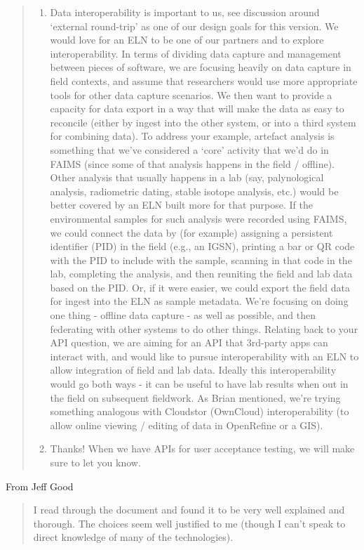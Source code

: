 \documentclass{faims3_report}
\begin{document}
\begin{quote}
\begin{enumerate}[itemsep=1em]
\item Data interoperability is important to us, see discussion around `external
  round-trip' as one of our design goals for this version. We would love
  for an ELN to be one of our partners and to explore interoperability. In 
  terms of dividing data capture and management between pieces of software, we 
  are focusing heavily on data capture in field contexts, and assume that 
  researchers would use more appropriate tools for other data capture scenarios.
  We then want to provide a capacity for data export in a way that will make the 
  data as easy to reconcile (either by ingest into the other system, or into a third
  system for combining data). To address your example, artefact analysis is something that we've 
  considered a `core' activity that we'd do in FAIMS (since some of that analysis happens in 
  the field / offline). Other analysis that usually happens in a lab (say, palynological 
  analysis, radiometric dating, stable isotope analysis, etc.) would be better covered by an ELN
  built more for that purpose. If the environmental samples for such analysis were recorded
  using FAIMS, we could connect the data by (for example) assigning a persistent identifier (PID) in the 
  field (e.g., an IGSN), printing a bar or QR code with the PID to include with the sample, scanning 
  in that code in the lab, completing the analysis, and then reuniting the field and lab data based 
  on the PID. Or, if it were easier, we could export the field data for ingest into the ELN 
  as sample metadata. We're focusing on doing one thing - offline data capture - as well as possible, 
  and then federating with other systems to do other things. Relating back to your API question, 
  we are aiming for an API that 3rd-party apps can interact with, and would like to pursue 
  interoperability with an ELN to allow integration of field and lab data. Ideally this 
  interoperability would go both ways - it can be useful to have lab results when out 
  in the field on subsequent fieldwork. As Brian mentioned, we're trying something 
  analogous with Cloudstor (OwnCloud) interoperability (to allow online viewing / 
  editing of data in OpenRefine or a GIS).
 
\item Thanks! When we have APIs for user acceptance testing, we will make
  sure to let you know.
 
\end{enumerate}
\end{quote}
From Jeff Good
\begin{quote}
I read through the document and found it to be very well explained and
thorough. The choices seem well justified to me (though I can't speak to
direct knowledge of many of the technologies).
\end{quote}
\end{document}

